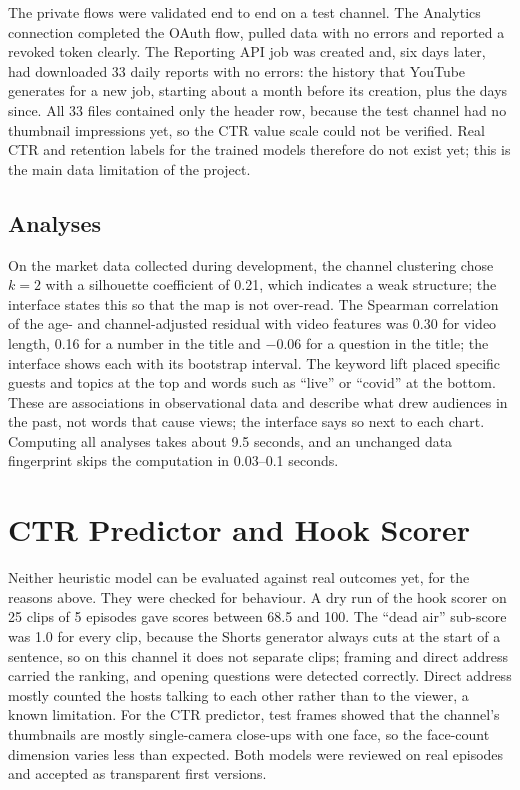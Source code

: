 The private flows were validated end to end on a test channel. The Analytics connection completed the OAuth flow, pulled data with no errors and reported a revoked token clearly. The Reporting API job was created and, six days later, had downloaded 33 daily reports with no errors: the history that YouTube generates for a new job, starting about a month before its creation, plus the days since. All 33 files contained only the header row, because the test channel had no thumbnail impressions yet, so the CTR value scale could not be verified. Real CTR and retention labels for the trained models therefore do not exist yet; this is the main data limitation of the project.

\subsection*{Analyses}

On the market data collected during development, the channel clustering chose $k = 2$ with a silhouette coefficient of 0.21, which indicates a weak structure; the interface states this so that the map is not over-read. The Spearman correlation of the age- and channel-adjusted residual with video features was 0.30 for video length, 0.16 for a number in the title and $-0.06$ for a question in the title; the interface shows each with its bootstrap interval. The keyword lift placed specific guests and topics at the top and words such as ``live'' or ``covid'' at the bottom. These are associations in observational data and describe what drew audiences in the past, not words that cause views; the interface says so next to each chart. Computing all analyses takes about 9.5 seconds, and an unchanged data fingerprint skips the computation in 0.03--0.1 seconds.

\section{CTR Predictor and Hook Scorer}

Neither heuristic model can be evaluated against real outcomes yet, for the reasons above. They were checked for behaviour. A dry run of the hook scorer on 25 clips of 5 episodes gave scores between 68.5 and 100. The ``dead air'' sub-score was 1.0 for every clip, because the Shorts generator always cuts at the start of a sentence, so on this channel it does not separate clips; framing and direct address carried the ranking, and opening questions were detected correctly. Direct address mostly counted the hosts talking to each other rather than to the viewer, a known limitation. For the CTR predictor, test frames showed that the channel's thumbnails are mostly single-camera close-ups with one face, so the face-count dimension varies less than expected. Both models were reviewed on real episodes and accepted as transparent first versions.


